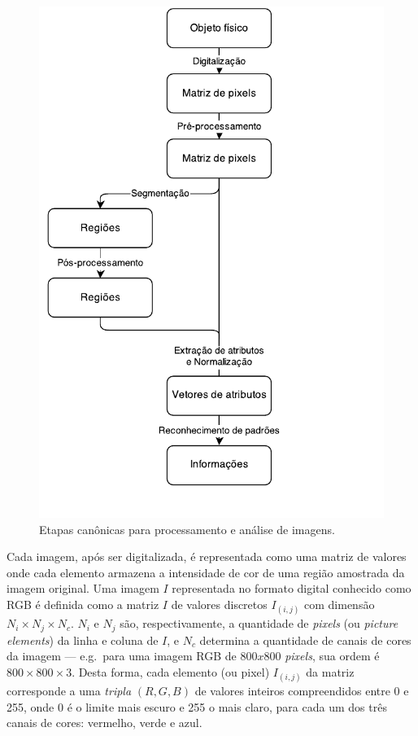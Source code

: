 \begin{figure}[ht!]
\begin{center}
        \includegraphics[scale=.6]{figs/etapas_pdi}
      \caption{Etapas canônicas para processamento e análise de imagens.}
        \label{fig:etapas-pdi}
\end{center}
\end{figure}

Cada imagem, após ser digitalizada, é representada como uma matriz de valores
onde cada elemento armazena a intensidade de cor de uma região amostrada da
imagem original. Uma imagem $I$ representada no formato digital conhecido como
RGB é definida como a matriz $I$ de valores discretos $I_{(i,j)}$ com dimensão
$N_i \times N_j \times N_c$. $N_i$ e $N_j$ são, respectivamente, a quantidade de
\textit{pixels} (ou \textit{picture elements}) da linha e coluna de $I$, e $N_c$
determina a quantidade de canais de cores da imagem --- e.g.\ para uma imagem
RGB de $800 x 800$ \textit{pixels}, sua ordem é $800 \times 800 \times 3$. Desta
forma, cada elemento (ou pixel) $I_{(i,j)}$ da matriz corresponde a uma
\emph{tripla} $(R, G, B)$ de valores inteiros compreendidos entre 0 e 255, onde
0 é o limite mais escuro e 255 o mais claro, para cada um dos três canais de
cores: vermelho, verde e azul.

